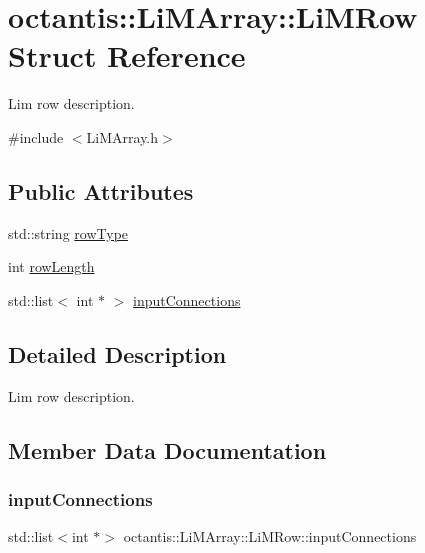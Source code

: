 \hypertarget{structoctantis_1_1LiMArray_1_1LiMRow}{}\section{octantis\+:\+:Li\+M\+Array\+:\+:Li\+M\+Row Struct Reference}
\label{structoctantis_1_1LiMArray_1_1LiMRow}


Lim row description.  




{\ttfamily \#include $<$Li\+M\+Array.\+h$>$}

\subsection*{Public Attributes}
\begin{DoxyCompactItemize}
\item 
std\+::string \hyperlink{structoctantis_1_1LiMArray_1_1LiMRow_aa35d698f2e26f6e0e66026fd2e8686a1}{row\+Type}
\item 
int \hyperlink{structoctantis_1_1LiMArray_1_1LiMRow_ac8d2c9fe6d1958d880fa4c55c57b8b29}{row\+Length}
\item 
std\+::list$<$ int $\ast$ $>$ \hyperlink{structoctantis_1_1LiMArray_1_1LiMRow_ae919d702f87bd1abf0c973d973847891}{input\+Connections}
\end{DoxyCompactItemize}


\subsection{Detailed Description}
Lim row description. 

\subsection{Member Data Documentation}
\mbox{\label{structoctantis_1_1LiMArray_1_1LiMRow_ae919d702f87bd1abf0c973d973847891}} 
\subsubsection{\texorpdfstring{input\+Connections}{inputConnections}}
{\footnotesize\ttfamily std\+::list$<$int $\ast$$>$ octantis\+::\+Li\+M\+Array\+::\+Li\+M\+Row\+::input\+Connections}

